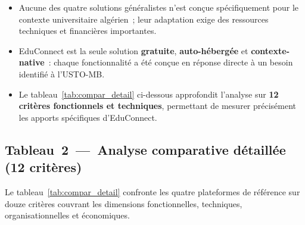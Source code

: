 ﻿\documentclass[12pt,a4paper,oneside]{report}
\begin{document}


\medskip
\begin{tcolorbox}[
  colback  = ustolightblue!20,
  colframe = ustoblue,
  coltitle = white,
  fonttitle= \bfseries,
  title    = {Observations cl\'es issues du tableau~\ref{tab:compar_synth}~---~vers une analyse crit\`ere par crit\`ere},
  left=8pt, right=8pt, top=6pt, bottom=6pt,
  sharp corners=south
]
\begin{itemize}
  \item Aucune des quatre solutions g\'en\'eralistes n'est con\c{c}ue sp\'ecifiquement pour le contexte universitaire alg\'erien~; leur adaptation exige des ressources techniques et financi\`eres importantes.
  \item EduConnect est la seule solution \textbf{gratuite}, \textbf{auto-h\'eberg\'ee} et \textbf{contexte-native}~: chaque fonctionnalit\'e a \'et\'e con\c{c}ue en r\'eponse directe \`a un besoin identifi\'e \`a l'USTO-MB.
  \item Le tableau~\ref{tab:compar_detail} ci-dessous approfondit l'analyse sur \textbf{12 crit\`eres fonctionnels et techniques}, permettant de mesurer pr\'ecis\'ement les apports sp\'ecifiques d'EduConnect.
\end{itemize}
\end{tcolorbox}
\medskip

\subsection{Tableau~2~---~Analyse comparative d\'etaill\'ee (12 crit\`eres)}

Le tableau~\ref{tab:compar_detail} confronte les quatre plateformes de r\'ef\'erence sur douze crit\`eres couvrant les dimensions fonctionnelles, techniques, organisationnelles et \'economiques.
\end{document}
